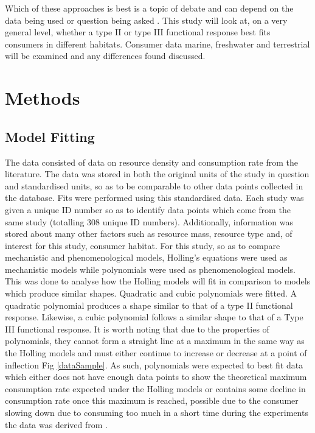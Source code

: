 \documentclass[a4paper]{article}
\numberwithin{equation}{section}
\begin{document}
  Which of these approaches is best is a topic of debate and can depend on the data being used or question being asked \cite{Geritz2012, Gustafson2013}.  
\newline
This study will look at, on a very general level, whether a type II or type III functional response best fits consumers in different habitats.  Consumer data marine, freshwater and terrestrial will be examined and any differences found discussed.



\newpage
\section{Methods}
\subsection{Model Fitting}
The data consisted of data on resource density and consumption rate from the literature.  The data was stored in both the original units of the study in question and standardised units, so as to be comparable to other data points collected in the database.  Fits were performed using this standardised data.  Each study was given a unique ID number so as to identify data points which come from the same study (totalling 308 unique ID numbers).  Additionally, information was stored about many other factors such as resource mass, resource type and, of interest for this study, consumer habitat. 
\newline 
For this study, so as to compare mechanistic and phenomenological models, Holling's equations were used as mechanistic models while polynomials were used as phenomenological models.  This was done to analyse how the Holling models will fit in comparison to models which produce similar shapes.  Quadratic and cubic polynomials were fitted.  A quadratic polynomial produces a shape similar to that of a type II functional response.  Likewise, a cubic polynomial follows a similar shape to that of a Type III functional response.  It is worth noting that due to the properties of polynomials, they cannot form a straight line at a maximum in the same way as the Holling models and must either continue to increase or decrease at a point of inflection Fig \ref{dataSample}.  As such, polynomials were expected to best fit data which either does not have enough data points to show the theoretical maximum consumption rate expected under the Holling models or contains some decline in consumption rate once this maximum is reached, possible due to the consumer slowing down due to consuming too much in a short time during the experiments the data was derived from \citep{Jeschke2002a}.
\end{document}
